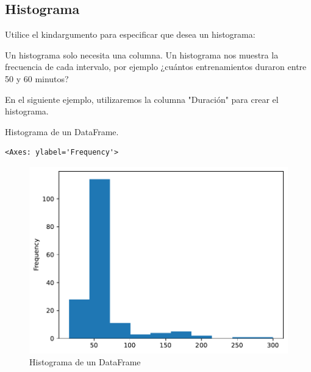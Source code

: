 \subsection{Histograma}

Utilice el kindargumento para especificar que desea un histograma:
\begin{Shaded}
\begin{Highlighting}[]
\OperatorTok{=} 
\end{Highlighting}
\end{Shaded}

Un histograma solo necesita una columna. Un histograma nos muestra la
frecuencia de cada intervalo, por ejemplo ¿cuántos entrenamientos
duraron entre 50 y 60 minutos?

En el siguiente ejemplo, utilizaremos la columna "Duración" para crear
el histograma.\\

\begin{code} Histograma de un DataFrame.

\begin{Shaded}
\begin{Highlighting}[]
\NormalTok{df[}\NormalTok{].plot(kind }\OperatorTok{=} \NormalTok{)}
\end{Highlighting}
\end{Shaded}

\begin{verbatim}
<Axes: ylabel='Frequency'>
\end{verbatim}

\begin{figure}
  \centering
  \includegraphics[scale=0.75]{img/grafica904.pdf}  
  \caption{Histograma de un DataFrame}
\end{figure}

\end{code}

